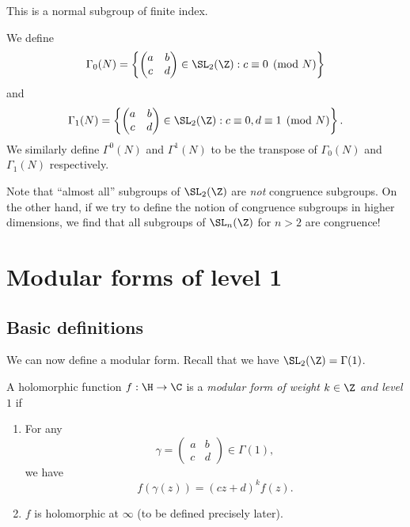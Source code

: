 \documentclass[a4paper]{article}
\begin{document}
This is a normal subgroup of finite index.
\begin{defi}
  We define
  \[
    \Gamma_0(N) =\left\{
      \begin{pmatrix}
        a & b\\
        c & d
      \end{pmatrix}
    \in \SL_2(\Z): c \equiv 0\pmod N\right\}
  \]
  and
  \[
    \Gamma_1(N) =\left\{
      \begin{pmatrix}
        a & b\\
        c & d
      \end{pmatrix}
    \in \SL_2(\Z): c \equiv 0, d\equiv 1 \pmod N\right\}.
  \]
  We similarly define $\Gamma^0(N)$ and $\Gamma^1(N)$ to be the transpose of $\Gamma_0(N)$ and $\Gamma_1(N)$ respectively.
\end{defi}
Note that ``almost all'' subgroups of $\SL_2(\Z)$ are \emph{not} congruence subgroups. On the other hand, if we try to define the notion of congruence subgroups in higher dimensions, we find that all subgroups of $\SL_n(\Z)$ for $n > 2$ are congruence!

\section{Modular forms of level 1}
\subsection{Basic definitions}
We can now define a modular form. Recall that we have $\SL_2(\Z) = \Gamma(1)$.
\begin{defi}
  A holomorphic function $f: \H \to \C$ is a \emph{modular form of weight $k \in \Z$ and level $1$} if
  \begin{enumerate}
    \item For any
      \[
        \gamma =
        \begin{pmatrix}
          a & b\\
          c & d
        \end{pmatrix} \in \Gamma(1),
      \]
      we have
      \[
        f(\gamma(z)) = (cz + d)^k f(z).
      \]
    \item $f$ is holomorphic at $\infty$ (to be defined precisely later).
  \end{enumerate}
\end{defi}
\end{document}
